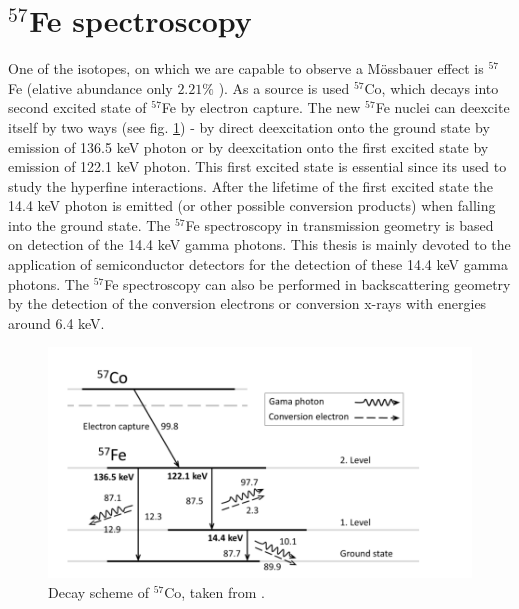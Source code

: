 \section{$^{57}$Fe spectroscopy}

One of the isotopes, on which we are capable to observe a Mössbauer effect is $^{57}$Fe (elative abundance only $2.21 \%$ \cite{compounds}). As a source is used $^{57}$Co, which decays into second excited state of $^{57}$Fe by electron capture. The new $^{57}$Fe nuclei can deexcite itself by two ways (see fig. \ref{Fe57scheme}) - by direct deexcitation onto the ground state by emission of 136.5 keV photon or by deexcitation onto the first excited state by emission of 122.1 keV photon. This first excited state is essential since its used to study the hyperfine interactions. After the lifetime of the first excited state the 14.4 keV photon is emitted (or other possible conversion products) when falling into the ground state. The $^{57}$Fe spectroscopy in transmission geometry is based on detection of the 14.4 keV gamma photons. This thesis is mainly devoted to the application of semiconductor detectors for the detection of these 14.4 keV gamma photons. The $^{57}$Fe spectroscopy can also be performed in backscattering geometry by the detection of the conversion electrons or conversion x-rays with energies around 6.4 keV.

\begin{figure}[H]
 \centering
 \includegraphics[scale=0.75, angle = 0]{./pictures/Fe57}
 \caption{Decay scheme of $^{57}$Co, taken from \cite{NOVAK2016thesis}.}
 \label{Fe57scheme}
 
\end{figure}


